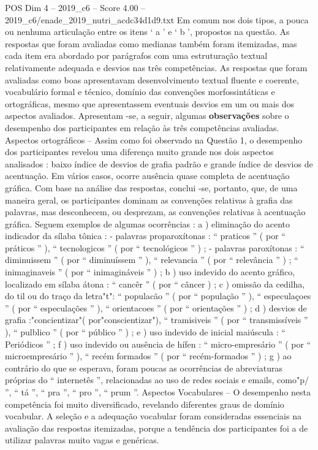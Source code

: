 \begin{textsample}{POS Dim 4 – 2019\_c6 – Score 4.00 – 2019\_c6/enade\_2019\_nutri\_acdc34d1d9.txt}
Em comum nos dois tipos, a pouca ou nenhuma articulação entre os itens ‘ a ’ e ‘ b ’, propostos na questão.
As respostas que foram avaliadas como medianas também foram itemizadas, mas cada item era abordado por parágrafos com uma estruturação textual relativamente adequada e desvios nas três competências.
As respostas que foram avaliadas como boas apresentavam desenvolvimento textual fluente e coerente, vocabulário formal e técnico, domínio das convenções morfossintáticas e ortográficas, mesmo que apresentassem eventuais desvios em um ou mais dos aspectos avaliados.
Apresentam -se, a seguir, algumas \textbf{observações} sobre o desempenho dos participantes em relação às três competências avaliadas.
Aspectos ortográficos – Assim como foi observado na Questão 1, o desempenho dos participantes revelou uma diferença muito grande nos dois aspectos analisados : baixo índice de desvios de grafia padrão e grande índice de desvios de acentuação.
Em vários casos, ocorre ausência quase completa de acentuação gráfica.
Com base na análise das respostas, conclui -se, portanto, que, de uma maneira geral, os participantes dominam as convenções relativas à grafia das palavras, mas desconhecem, ou desprezam, as convenções relativas à acentuação gráfica.
Seguem exemplos de algumas ocorrências : a ) eliminação do acento indicador da sílaba tônica : - palavras proparoxítonas : “ praticos ” ( por “ práticos ” ), “ tecnologicos ” ( por “ tecnológicos ” ) ; - palavras paroxítonas : “ diminuissem ” ( por “ diminuíssem ” ), “ relevancia ” ( por “ relevância ” ) ; “ inimaginaveis ” ( por “ inimagináveis ” ) ; b ) uso indevido do acento gráfico, localizado em sílaba átona : “ cancêr ” ( por “ câncer ) ; c ) omissão da cedilha, do til ou do traço da letra"t": “ populacão ” ( por “ população ” ), “ especulaçoes ” ( por “ especulações ” ), “ orientacoes ” ( por “ orientações ” ) ; d ) desvios de grafia :"concientizar"( por"conscientizar"), “ tramisiveis ” ( por “ transmissíveis ” ), “ pulblico ” ( por “ público ” ) ; e ) uso indevido de inicial maiúscula : “ Periódicos ” ; f ) uso indevido ou ausência de hífen : “ micro-empresário ” ( por “ microempresário ” ), “ recém formados ” ( por “ recém-formados ” ) ; g ) ao contrário do que se esperava, foram poucas as ocorrências de abreviaturas próprias do “ internetês ”, relacionadas ao uso de redes sociais e emails, como"p/ ”, “ tá ”, “ pra ”, “ pro ”, “ prum ”.
Aspectos Vocabulares – O desempenho nesta competência foi muito diversificado, revelando diferentes graus de domínio vocabular.
A seleção e a adequação vocabular foram consideradas essenciais na avaliação das respostas itemizadas, porque a tendência dos participantes foi a de utilizar palavras muito vagas e genéricas.

\end{textsample}
